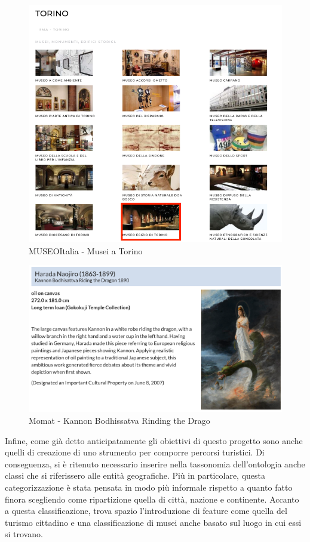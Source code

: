 \documentclass[12pt]{article}
\begin{document}
\begin{figure}[!h]
   \centering
   \includegraphics[scale=0.5]{fig/opera di MuseiITALIA.png}
   \caption{MUSEOItalia - Musei a Torino}\label{fig:picture}
\end{figure}
\begin{figure}[!h]
   \centering
   \includegraphics[scale=0.5]{fig/opera del Momat.png}
   \caption{Momat - Kannon Bodhissatva Rinding the Drago}\label{fig:picture}
\end{figure}

Infine, come già detto anticipatamente gli obiettivi di questo progetto sono anche quelli di creazione di uno strumento per comporre percorsi turistici. Di conseguenza, si è ritenuto necessario inserire nella tassonomia dell’ontologia anche classi che si riferissero alle entità geografiche. Più in particolare, questa categorizzazione è stata pensata in modo più informale rispetto a quanto fatto finora scegliendo come ripartizione quella di città, nazione e continente. Accanto a questa classificazione, trova spazio l’introduzione di feature come quella del turismo cittadino e una classificazione di musei anche basato sul luogo in cui essi si trovano.
\end{document}
